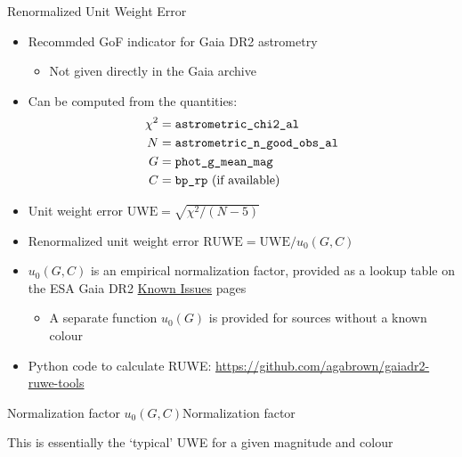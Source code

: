 \documentclass[smaller, aspectratio=169]{beamer}
\begin{document}
\begin{agaframe}{Renormalized Unit Weight Error}
  \begin{itemize}
    \item Recommded GoF indicator for Gaia DR2 astrometry
      \begin{itemize}
        \item Not given directly in the Gaia archive
      \end{itemize}
    \item Can be computed from the quantities:
      \begin{align*}
        \chi^2 & = \text{\tt astrometric\_chi2\_al} \\
        N & = \text{\tt astrometric\_n\_good\_obs\_al} \\
        G & = \text{\tt phot\_g\_mean\_mag} \\
        C & = \text{{\tt bp\_rp} (if available)}
      \end{align*}
    \item Unit weight error $\text{UWE} = \sqrt{\chi^2/(N-5)}$
    \item Renormalized unit weight error $\text{RUWE}=\text{UWE}/u_0(G,C)$
    \item $u_0(G,C)$ is an empirical normalization factor, provided as a lookup table on the ESA
      Gaia DR2 \href{https://www.cosmos.esa.int/web/gaia/dr2-known-issues}{Known Issues} pages
      \begin{itemize}
        \item A separate function $u_0(G)$ is provided for sources without a known colour
      \end{itemize}
    \item Python code to calculate RUWE: \url{https://github.com/agabrown/gaiadr2-ruwe-tools}
  \end{itemize}
\end{agaframe}
%
%
\begin{agaframealt}{Normalization factor $u_0(G,C)$}{Normalization factor}
  \begin{center}
  \end{center}
  
  \medskip
  This is essentially the `typical' UWE for a given magnitude and colour
\end{agaframealt}
\end{document}
